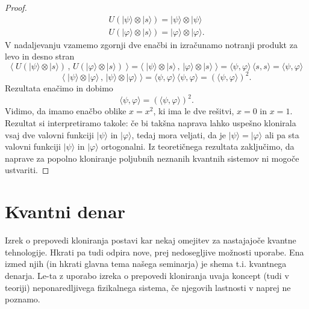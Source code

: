 \documentclass[12pt]{article}
\providecommand{\DIFadd}[1]{{\protect\color{blue}\uwave{#1}}} %
\providecommand{\DIFaddbegin}{} %
\providecommand{\DIFaddend}{} %
\newcommand{\DIFaddincludegraphics}[2][]{{\color{blue}\fbox{\DIFOincludegraphics[#1]{#2}}}} %
\DeclareRobustCommand{\DIFaddbegin}{\DIFOaddbegin \let\includegraphics\DIFaddincludegraphics} %
\DeclareRobustCommand{\DIFaddend}{\DIFOaddend \let\includegraphics\DIFOincludegraphics} %
\begin{document}
\begin{proof}
\begin{equation}
\begin{split}
U(| \psi \rangle \otimes | s \rangle) = | \psi \rangle \otimes | \psi \rangle
\\U(| \varphi \rangle \otimes | s \rangle) = | \varphi \rangle \otimes | \varphi \rangle.
\end{split}
\end{equation}
V nadaljevanju vzamemo zgornji dve enačbi in izračunamo notranji \DIFaddbegin \DIFadd{(skalarni) }\DIFaddend produkt za levo in desno stran
\begin{equation}
\langle \; U(| \psi \rangle \otimes | s \rangle) \, , \, U(| \varphi \rangle \otimes | s \rangle) \; \rangle = \langle \; | \psi \rangle \otimes | s \rangle \, , \, | \varphi \rangle \otimes | s \rangle \; \rangle = \langle \psi, \varphi \rangle \, \langle s, s \rangle = \langle \psi, \varphi \rangle
\end{equation}
\begin{equation}
\langle \; | \psi \rangle \otimes | \varphi \rangle \, , \, | \psi \rangle \otimes | \varphi \rangle \; \rangle = \langle \psi, \varphi \rangle \, \langle \psi, \varphi \rangle = \left( \langle \psi, \varphi \rangle \right)^2.
\end{equation}
Rezultata enačimo in dobimo
\begin{equation}
 \langle \psi, \varphi \rangle = \left( \langle \psi, \varphi \rangle \right)^2.
\end{equation}
Vidimo, da imamo enačbo oblike $x = x^2$, ki ima le dve rešitvi, $x = 0$ in $x = 1$. Rezultat si interpretiramo takole: če bi takšna naprava lahko uspešno klonirala vsaj dve valovni funkciji $| \psi \rangle$ in $| \varphi \rangle$, tedaj mora veljati, da je $ | \psi \rangle = | \varphi \rangle$ ali pa sta valovni funkciji $| \psi \rangle$ in $| \varphi \rangle$ ortogonalni. Iz teoretičnega rezultata zaključimo, da naprave za popolno kloniranje poljubnih neznanih kvantnih sistemov ni mogoče ustvariti.
\end{proof}

\section{Kvantni denar} 

Izrek o prepovedi kloniranja postavi kar nekaj omejitev za nastajajoče kvantne tehnologije. Hkrati pa tudi odpira nove, prej nedosegljive možnosti uporabe. Ena izmed njih (in hkrati glavna tema našega seminarja) je shema t.i. kvantnega denarja. Le-ta z uporabo izreka o prepovedi kloniranja uvaja koncept (tudi v teoriji) neponaredljivega fizikalnega sistema, če njegovih lastnosti v naprej ne poznamo.
\end{document}
